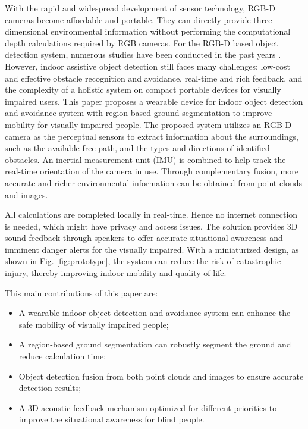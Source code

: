 \documentclass{ieeeaccess}
\begin{document}
With the rapid and widespread development of sensor technology, RGB-D cameras become affordable and portable. They can directly provide three-dimensional environmental information without performing the computational depth calculations required by RGB cameras.
For the RGB-D based object detection system, numerous studies have been conducted in the past years \cite{kayukawa2019bbeep} \cite{vision_based_mobile_indoor_nav_BingLi_2019} \cite{aladren2014navigation} \cite{lee2014wearable}. However, indoor assistive object detection still faces many challenges: low-cost and effective obstacle recognition and avoidance, real-time and rich feedback, and the complexity of a holistic system on compact portable devices for visually impaired users.
This paper proposes a wearable device for indoor object detection and avoidance system with region-based ground segmentation to improve mobility for visually impaired people. The proposed system utilizes an RGB-D camera as the perceptual sensors to extract information about the surroundings, such as the available free path, and the types and directions of identified obstacles. An inertial measurement unit (IMU) is combined to help track the real-time orientation of the camera in use. Through complementary fusion, more accurate and richer environmental information can be obtained from point clouds and images.



All calculations are completed locally in real-time. Hence no internet connection is needed, which might have privacy and access issues. The solution provides 3D sound feedback through speakers to offer accurate situational awareness and imminent danger alerts for the visually impaired. With a miniaturized design, as shown in Fig. \ref{fig:prototype}, the system can reduce the risk of catastrophic injury, thereby improving indoor mobility and quality of life.

This main contributions of this paper are:
\begin{itemize}
    \item A wearable indoor object detection and avoidance system can enhance the safe mobility of visually impaired people;
    
    \item A region-based ground segmentation can robustly segment the ground and reduce calculation time;
    
    \item Object detection fusion from both point clouds and images to ensure accurate detection results;
    
    \item A 3D acoustic feedback mechanism optimized for different priorities to improve the situational awareness for blind people.

\end{itemize}
\end{document}
